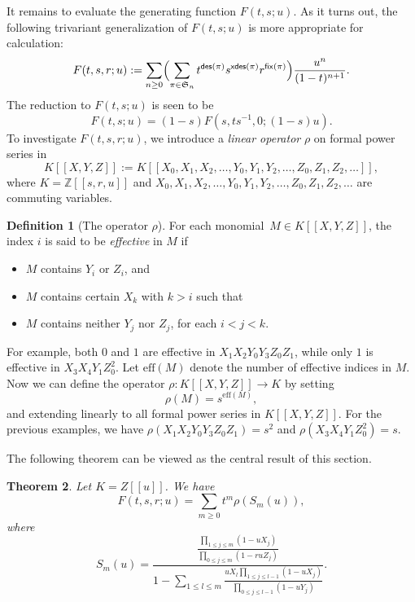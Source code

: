 \documentclass[12pt]{amsart}
\numberwithin{equation}{section}
\theoremstyle{plain}
\newtheorem{theorem}{Theorem}[section]
\theoremstyle{definition}
\newtheorem{Def}[theorem]{Definition}
\def\xdes{\mathsf{xdes}}
\def\fix{\mathsf{fix}}
\def\des{\mathsf{des}}
\def\S{\mathfrak{S}}
\def\eff{\mathrm{eff}}
\begin{document}
It remains to evaluate the generating function $F(t,s;u)$. As it turns out, the following trivariant generalization of $F(t,s;u)$ is more appropriate for calculation:
\begin{equation}
F(t,s,r; u):=\sum_{n\geq 0} \Bigl( \sum_{\pi\in \S_n} 
	 t^{\des(\pi)}  s^{\xdes(\pi)} r^{\fix(\pi)}\Bigr) \frac {u^n}{(1-t)^{n+1}}.
\end{equation}
The reduction to $F(t,s;u)$ is seen to be
\begin{equation*}
F(t,s;u)=(1-s)F(s,ts^{-1},0;(1-s)u).
\end{equation*}
To investigate $F(t,s,r; u)$, we introduce a {\it linear operator} $\rho$ on formal power series in 
$$K[[X,Y,Z]]:=K[[X_0,X_1,X_2,\ldots, Y_0, Y_1, Y_2, \ldots, Z_0, Z_1, Z_2,\ldots]],$$ 
where 
$K=\mathbb{Z}[[s,r,u]]$ and
$X_0,X_1,X_2,\ldots, Y_0, Y_1, Y_2, \ldots, Z_0, Z_1, Z_2,\ldots$ are commuting variables.

\begin{Def}[The operator $\rho$]
For each monomial~$M\in K[[X,Y,Z]]$, the index $i$ is said to be {\em effective} in $M$ if
\begin{itemize}
	\item[i)] $M$ contains $Y_i$ or $Z_i$, and
	\item[ii)] $M$ contains certain $X_k$ with $k>i$ such that
	\item[iii)] $M$ contains neither $Y_j$ nor $Z_j$, for each $i<j<k$.
\end{itemize}
For example, both $0$ and $1$ are effective in $X_1X_2Y_0Y_3Z_0Z_1$, while only $1$ is effective in $X_3X_4Y_1Z_0^2$. Let $\eff(M)$ denote the number of effective indices in $M$. Now we can define the operator $\rho: K[[X,Y,Z]]\rightarrow K$ by setting
\begin{equation}
\rho(M)=s^{\eff(M)},
\end{equation}
and extending linearly to all formal power series in $K[[X,Y,Z]]$. For the previous examples, we have $\rho(X_1X_2Y_0Y_3Z_0Z_1)=s^2$ and $\rho(X_3X_4Y_1Z_0^2)=s$.
\end{Def}

The following theorem can be viewed as the central result of this section.
\begin{theorem}\label{gfF:frac} Let $K=Z[[u]]$. We have
	\begin{equation}\label{eq:rhofrac}
		F(t,s,r ;u) = \sum_{m\geq 0} t^m \rho(S_m(u)),
		
	\end{equation}
	where
	\begin{equation}\label{def:Sm}
		S_m(u) = 
		\frac{\displaystyle \frac{\prod_{1\leq j \leq m}(1-uX_j)}{\prod_{0\le j\le m}(1-ruZ_j)}}{\displaystyle 1-\sum_{1\leq l \leq m} 
		\frac{u X_l \prod_{1\leq j \leq l-1}(1-u X_j)}{\prod_{0\leq j \leq l-1}(1-uY_j)}}.
	\end{equation}
\end{theorem}
\end{document}
